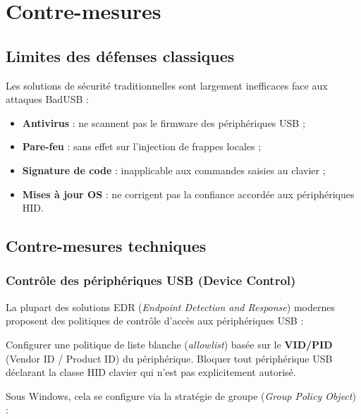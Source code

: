 \documentclass[12pt,a4paper]{report}
\begin{document}
\chapter{Contre-mesures}
\label{chap:contremesures}

\section{Limites des défenses classiques}

Les solutions de sécurité traditionnelles sont largement inefficaces face aux attaques BadUSB :

\begin{itemize}
  \item \textbf{Antivirus} : ne scannent pas le firmware des périphériques USB ;
  \item \textbf{Pare-feu} : sans effet sur l'injection de frappes locales ;
  \item \textbf{Signature de code} : inapplicable aux commandes saisies au clavier ;
  \item \textbf{Mises à jour OS} : ne corrigent pas la confiance accordée aux périphériques HID.
\end{itemize}

\section{Contre-mesures techniques}

\subsection{Contrôle des périphériques USB (Device Control)}

La plupart des solutions EDR (\textit{Endpoint Detection and Response}) modernes proposent des politiques de contrôle d'accès aux périphériques USB :

\begin{successbox}
Configurer une politique de liste blanche (\textit{allowlist}) basée sur le \textbf{VID/PID} (Vendor ID / Product ID) du périphérique. Bloquer tout périphérique USB déclarant la classe HID clavier qui n'est pas explicitement autorisé.
\end{successbox}

Sous Windows, cela se configure via la stratégie de groupe (\textit{Group Policy Object}) :
\end{document}
